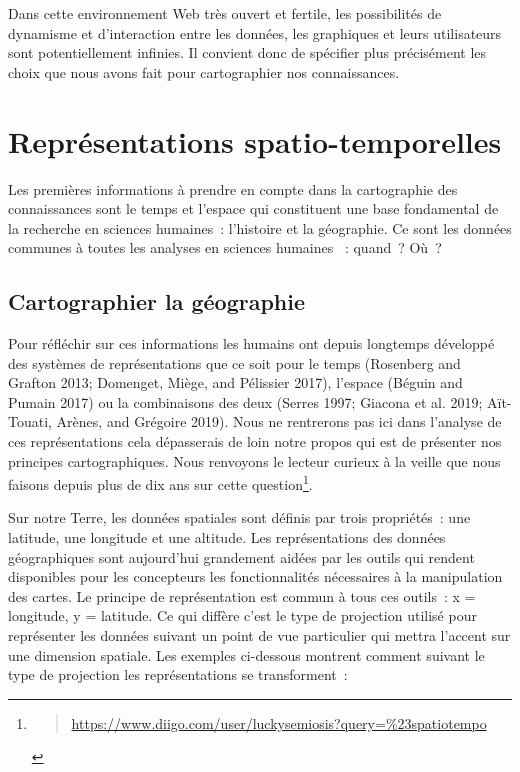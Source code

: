 \documentclass[
  letterpaper,
  DIV=11,
  numbers=noendperiod]{scrreprt}
\begin{document}
Dans cette environnement Web très ouvert et fertile, les possibilités de
dynamisme et d'interaction entre les données, les graphiques et leurs
utilisateurs sont potentiellement infinies. Il convient donc de
spécifier plus précisément les choix que nous avons fait pour
cartographier nos connaissances.

\hypertarget{sec-repSpatioTempo}{%
\section{Représentations spatio-temporelles}\label{sec-repSpatioTempo}}

Les premières informations à prendre en compte dans la cartographie des
connaissances sont le temps et l'espace qui constituent une base
fondamental de la recherche en sciences humaines~: l'histoire et la
géographie. Ce sont les données communes à toutes les analyses en
sciences humaines ~: quand~? Où~?

\hypertarget{sec-cartoGeo}{%
\subsection{Cartographier la géographie}\label{sec-cartoGeo}}

Pour réfléchir sur ces informations les humains ont depuis longtemps
développé des systèmes de représentations que ce soit pour le temps
(Rosenberg and Grafton 2013; Domenget, Miège, and Pélissier 2017),
l'espace (Béguin and Pumain 2017) ou la combinaisons des deux (Serres
1997; Giacona et al. 2019; Aït-Touati, Arènes, and Grégoire 2019). Nous
ne rentrerons pas ici dans l'analyse de ces représentations cela
dépasserais de loin notre propos qui est de présenter nos principes
cartographiques. Nous renvoyons le lecteur curieux à la veille que nous
faisons depuis plus de dix ans sur cette question\footnote{\begin{quote}
  \url{https://www.diigo.com/user/luckysemiosis?query=\%23spatiotempo}
  \end{quote}}.

Sur notre Terre, les données spatiales sont définis par trois
propriétés~: une latitude, une longitude et une altitude. Les
représentations des données géographiques sont aujourd'hui grandement
aidées par les outils qui rendent disponibles pour les concepteurs les
fonctionnalités nécessaires à la manipulation des cartes. Le principe de
représentation est commun à tous ces outils~: x = longitude, y =
latitude. Ce qui diffère c'est le type de projection utilisé pour
représenter les données suivant un point de vue particulier qui mettra
l'accent sur une dimension spatiale. Les exemples ci-dessous montrent
comment suivant le type de projection les représentations se
transforment~:
\end{document}
